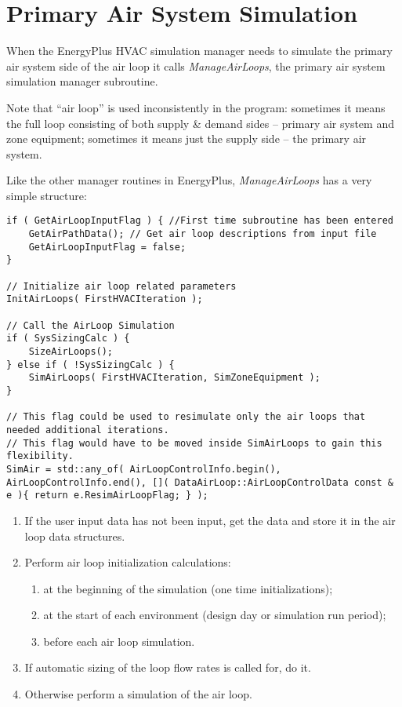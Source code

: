 \section{Primary Air System Simulation}\label{primary-air-system-simulation}

When the EnergyPlus HVAC simulation manager needs to simulate the primary air system side of the air loop it calls \emph{ManageAirLoops}, the primary air system simulation manager subroutine.

Note that ``air loop'' is used inconsistently in the program: sometimes it means the full loop consisting of both supply \& demand sides -- primary air system and zone equipment; sometimes it means just the supply side -- the primary air system.

Like the other manager routines in EnergyPlus, \emph{ManageAirLoops} has a very simple structure:

\begin{lstlisting}
if ( GetAirLoopInputFlag ) { //First time subroutine has been entered
	GetAirPathData(); // Get air loop descriptions from input file
	GetAirLoopInputFlag = false;
}

// Initialize air loop related parameters
InitAirLoops( FirstHVACIteration );

// Call the AirLoop Simulation
if ( SysSizingCalc ) {
	SizeAirLoops();
} else if ( !SysSizingCalc ) {
	SimAirLoops( FirstHVACIteration, SimZoneEquipment );
}

// This flag could be used to resimulate only the air loops that needed additional iterations.
// This flag would have to be moved inside SimAirLoops to gain this flexibility.
SimAir = std::any_of( AirLoopControlInfo.begin(), AirLoopControlInfo.end(), []( DataAirLoop::AirLoopControlData const & e ){ return e.ResimAirLoopFlag; } );
\end{lstlisting}

\begin{enumerate}
\def\labelenumi{\arabic{enumi}.}
\def\labelenumii{\alph{enumii}.}
\item
  If the user input data has not been input, get the data and store it in the air loop data structures.
\item
  Perform air loop initialization calculations:

    \begin{enumerate}
    \item
      at the beginning of the simulation (one time initializations);
    \item
      at the start of each environment (design day or simulation run period);
    \item
      before each air loop simulation.
    \end{enumerate}
\item
  If automatic sizing of the loop flow rates is called for, do it.
\item
  Otherwise perform a simulation of the air loop.
\end{enumerate}


